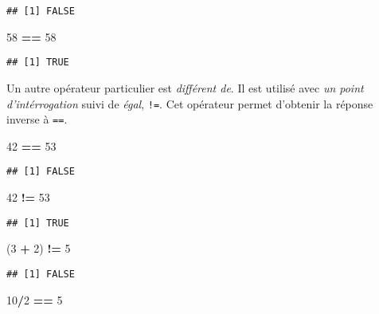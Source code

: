 \documentclass[]{book}
\newenvironment{Shaded}{\begin{snugshade}}{\end{snugshade}}
\newcommand{\DecValTok}[1]{\textcolor[rgb]{0.00,0.00,0.81}{#1}}
\newcommand{\StringTok}[1]{\textcolor[rgb]{0.31,0.60,0.02}{#1}}
\newcommand{\OperatorTok}[1]{\textcolor[rgb]{0.81,0.36,0.00}{\textbf{#1}}}
\newcommand{\NormalTok}[1]{#1}
\theoremstyle{definition}
\theoremstyle{definition}
\theoremstyle{definition}
\theoremstyle{remark}
\begin{document}
\begin{verbatim}
## [1] FALSE
\end{verbatim}

\begin{Shaded}
\begin{Highlighting}[]
\DecValTok{58} \OperatorTok{==}\StringTok{ }\DecValTok{58}
\end{Highlighting}
\end{Shaded}

\begin{verbatim}
## [1] TRUE
\end{verbatim}

Un autre opérateur particulier est \emph{différent de}. Il est utilisé
avec \emph{un point d'intérrogation} suivi de \emph{égal}, \texttt{!=}.
Cet opérateur permet d'obtenir la réponse inverse à \texttt{==}.

\begin{Shaded}
\begin{Highlighting}[]
\DecValTok{42} \OperatorTok{==}\StringTok{ }\DecValTok{53}
\end{Highlighting}
\end{Shaded}

\begin{verbatim}
## [1] FALSE
\end{verbatim}

\begin{Shaded}
\begin{Highlighting}[]
\DecValTok{42} \OperatorTok{!=}\StringTok{ }\DecValTok{53}
\end{Highlighting}
\end{Shaded}

\begin{verbatim}
## [1] TRUE
\end{verbatim}

\begin{Shaded}
\begin{Highlighting}[]
\NormalTok{(}\DecValTok{3} \OperatorTok{+}\StringTok{ }\DecValTok{2}\NormalTok{) }\OperatorTok{!=}\StringTok{ }\DecValTok{5}
\end{Highlighting}
\end{Shaded}

\begin{verbatim}
## [1] FALSE
\end{verbatim}

\begin{Shaded}
\begin{Highlighting}[]
\DecValTok{10}\OperatorTok{/}\DecValTok{2} \OperatorTok{==}\StringTok{ }\DecValTok{5}
\end{Highlighting}
\end{Shaded}
\end{document}
